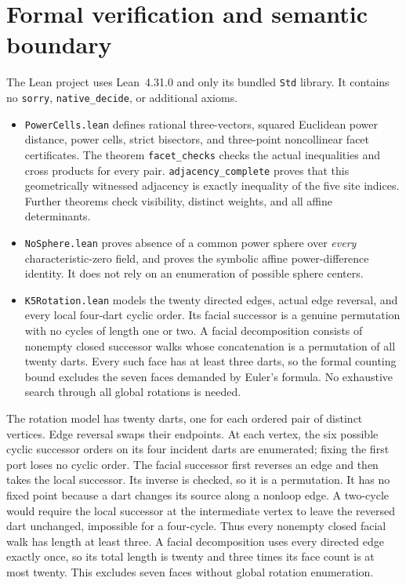 \documentclass[11pt]{article}
\begin{document}
\section{Formal verification and semantic boundary}
The Lean project uses Lean~4.31.0 and only its bundled \texttt{Std} library. It contains no \texttt{sorry}, \texttt{native\_decide}, or additional axioms.
\begin{itemize}
\item \texttt{PowerCells.lean} defines rational three-vectors, squared Euclidean power distance, power cells, strict bisectors, and three-point noncollinear facet certificates. The theorem \texttt{facet\_checks} checks the actual inequalities and cross products for every pair. \texttt{adjacency\_complete} proves that this geometrically witnessed adjacency is exactly inequality of the five site indices. Further theorems check visibility, distinct weights, and all affine determinants.
\item \texttt{NoSphere.lean} proves absence of a common power sphere over \emph{every} characteristic-zero field, and proves the symbolic affine power-difference identity. It does not rely on an enumeration of possible sphere centers.
\item \texttt{K5Rotation.lean} models the twenty directed edges, actual edge reversal, and every local four-dart cyclic order. Its facial successor is a genuine permutation with no cycles of length one or two. A facial decomposition consists of nonempty closed successor walks whose concatenation is a permutation of all twenty darts. Every such face has at least three darts, so the formal counting bound excludes the seven faces demanded by Euler's formula. No exhaustive search through all global rotations is needed.
\end{itemize}
The rotation model has twenty darts, one for each ordered pair of distinct vertices. Edge reversal swaps their endpoints. At each vertex, the six possible cyclic successor orders on its four incident darts are enumerated; fixing the first port loses no cyclic order. The facial successor first reverses an edge and then takes the local successor. Its inverse is checked, so it is a permutation. It has no fixed point because a dart changes its source along a nonloop edge. A two-cycle would require the local successor at the intermediate vertex to leave the reversed dart unchanged, impossible for a four-cycle. Thus every nonempty closed facial walk has length at least three. A facial decomposition uses every directed edge exactly once, so its total length is twenty and three times its face count is at most twenty. This excludes seven faces without global rotation enumeration.
\end{document}
